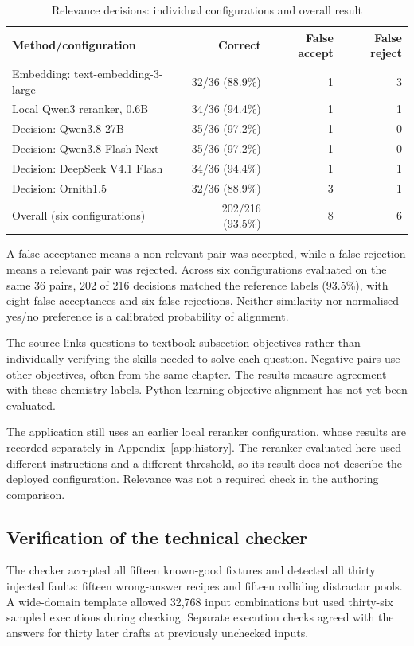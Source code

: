 \begin{table}[!htbp]
\centering{}\small
\setlength{\tabcolsep}{5pt}\renewcommand{\arraystretch}{1.15}
\caption{Relevance decisions: individual configurations and overall result}\label{tab:relevance}
\begin{tabularx}{\linewidth}{@{}X r r r@{}}
\toprule
\textbf{Method/configuration} & \textbf{Correct} & \textbf{False accept} & \textbf{False reject}\\
\midrule
Embedding: text-embedding-3-large & 32/36 (88.9\%) & 1 & 3\\
Local Qwen3 reranker, 0.6B & 34/36 (94.4\%) & 1 & 1\\
Decision: Qwen3.8 27B & 35/36 (97.2\%) & 1 & 0\\
Decision: Qwen3.8 Flash Next & 35/36 (97.2\%) & 1 & 0\\
Decision: DeepSeek V4.1 Flash & 34/36 (94.4\%) & 1 & 1\\
Decision: Ornith1.5 & 32/36 (88.9\%) & 3 & 1\\
\midrule
Overall (six configurations) & 202/216 (93.5\%) & 8 & 6\\
\bottomrule
\end{tabularx}
\end{table}

A false acceptance means a non-relevant pair was accepted, while a false rejection means a relevant pair was rejected. Across six configurations evaluated on the same 36 pairs, 202 of 216 decisions matched the reference labels (93.5\%), with eight false acceptances and six false rejections. Neither similarity nor normalised yes/no preference is a calibrated probability of alignment.

The source links questions to textbook-subsection objectives rather than individually verifying the skills needed to solve each question. Negative pairs use other objectives, often from the same chapter. The results measure agreement with these chemistry labels. Python learning-objective alignment has not yet been evaluated.

The application still uses an earlier local reranker configuration, whose results are recorded separately in Appendix~\ref{app:history}. The reranker evaluated here used different instructions and a different threshold, so its result does not describe the deployed configuration. Relevance was not a required check in the authoring comparison.

\subsection{Verification of the technical checker}\label{sec:checker-results}

The checker accepted all fifteen known-good fixtures and detected all thirty injected faults: fifteen wrong-answer recipes and fifteen colliding distractor pools. A wide-domain template allowed 32,768 input combinations but used thirty-six sampled executions during checking. Separate execution checks agreed with the answers for thirty later drafts at previously unchecked inputs.
